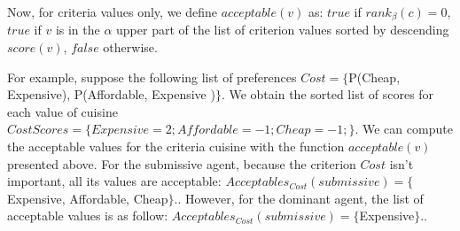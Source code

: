 \documentclass{llncs}
\begin{document}
Now, for criteria values only, we define $acceptable(v)$ as: $true$ if $rank_\beta(c)=0$, $true$ if $v$ is in the $\alpha$ upper part of the list of criterion values sorted by descending $score(v)$, $false$ otherwise.

\par For example, suppose the following list of preferences $ Cost = \{$P(Cheap, Expensive), P(Affordable, Expensive )$\}$.
We obtain the sorted list of scores for each value of cuisine   $Cost{Scores}= \{Expensive=2; Affordable= -1; Cheap= -1;\}$.
We can compute the acceptable values for the criteria cuisine with the function $acceptable(v)$ presented above. 
For the submissive agent, because the criterion $Cost$ isn't important, all its values are acceptable: $Acceptables_{Cost}(submissive) = \{$Expensive, Affordable, Cheap$\}.$. However, for the dominant agent, the list of acceptable values is as follow: $Acceptables_{Cost}(submissive) = \{$Expensive$\}.$.
\end{document}
